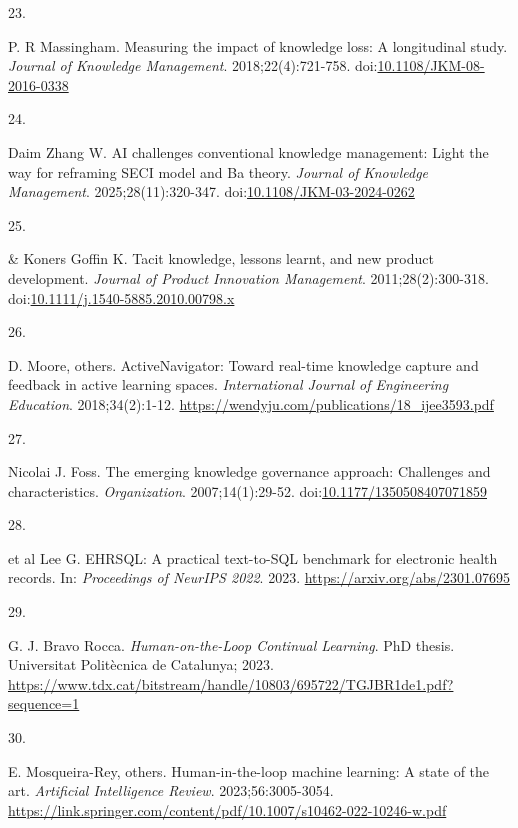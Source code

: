 \documentclass[
  american,
  11pt,
  letterpaper,
  oneside  ,captions=tableheading
]{scrartcl}
\newlength{\cslhangindent}
\newlength{\csllabelwidth}
\newenvironment{CSLReferences}[2] %
 {\begin{list}{}{%
  \setlength{\itemindent}{0pt}
  \setlength{\leftmargin}{0pt}
  \setlength{\parsep}{0pt}
  \ifodd #1
   \setlength{\leftmargin}{\cslhangindent}
   \setlength{\itemindent}{-1\cslhangindent}
  \fi
  \setlength{\itemsep}{#2\baselineskip}}}
 {\end{list}}
\newcommand{\CSLLeftMargin}[1]{\parbox[t]{\csllabelwidth}{\strut#1\strut}}
\newcommand{\CSLRightInline}[1]{\parbox[t]{\linewidth - \csllabelwidth}{\strut#1\strut}}
\begin{document}
\begin{CSLReferences}{0}{1}
\CSLLeftMargin{23. }%
\CSLRightInline{P. R Massingham. {Measuring the impact of knowledge
loss: A longitudinal study}. \emph{Journal of Knowledge Management}.
2018;22(4):721-758.
doi:\href{https://doi.org/10.1108/JKM-08-2016-0338}{10.1108/JKM-08-2016-0338}}

\CSLLeftMargin{24. }%
\CSLRightInline{Daim Zhang W. {{AI} challenges conventional knowledge
management: Light the way for reframing {SECI} model and Ba theory}.
\emph{Journal of Knowledge Management}. 2025;28(11):320-347.
doi:\href{https://doi.org/10.1108/JKM-03-2024-0262}{10.1108/JKM-03-2024-0262}}

\CSLLeftMargin{25. }%
\CSLRightInline{\& Koners Goffin K. {Tacit knowledge, lessons learnt,
and new product development}. \emph{Journal of Product Innovation
Management}. 2011;28(2):300-318.
doi:\href{https://doi.org/10.1111/j.1540-5885.2010.00798.x}{10.1111/j.1540-5885.2010.00798.x}}

\CSLLeftMargin{26. }%
\CSLRightInline{D. Moore, others. {ActiveNavigator: Toward real-time
knowledge capture and feedback in active learning spaces}.
\emph{International Journal of Engineering Education}. 2018;34(2):1-12.
\url{https://wendyju.com/publications/18_ijee3593.pdf}}

\CSLLeftMargin{27. }%
\CSLRightInline{Nicolai J. Foss. {The emerging knowledge governance
approach: Challenges and characteristics}. \emph{Organization}.
2007;14(1):29-52.
doi:\href{https://doi.org/10.1177/1350508407071859}{10.1177/1350508407071859}}

\CSLLeftMargin{28. }%
\CSLRightInline{et al Lee G. {EHRSQL: A practical text-to-SQL benchmark
for electronic health records}. In: \emph{Proceedings of NeurIPS 2022}.
2023. \url{https://arxiv.org/abs/2301.07695}}

\CSLLeftMargin{29. }%
\CSLRightInline{G. J. Bravo Rocca. \emph{Human-on-the-Loop Continual
Learning}. PhD thesis. Universitat Polit{è}cnica de Catalunya; 2023.
\url{https://www.tdx.cat/bitstream/handle/10803/695722/TGJBR1de1.pdf?sequence=1}}

\CSLLeftMargin{30. }%
\CSLRightInline{E. Mosqueira-Rey, others. Human-in-the-loop machine
learning: A state of the art. \emph{Artificial Intelligence Review}.
2023;56:3005-3054.
\url{https://link.springer.com/content/pdf/10.1007/s10462-022-10246-w.pdf}}


\end{CSLReferences}
\end{document}
